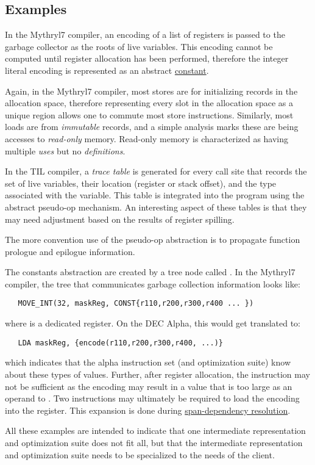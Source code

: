 \subsection{Examples}
   
   In the Mythryl7 compiler, an encoding of a list of registers
   is passed to the garbage collector as the roots of live
   variables. This encoding cannot be computed until register
   allocation has been performed, therefore the integer literal
   encoding is represented as an abstract 
   \href{constants.html}{constant}.

    Again, in the Mythryl7 compiler, most stores are for initializing 
   records in the allocation space, therefore representing every slot in
   the allocation space as a unique region allows one to commute
   most store instructions. Similarly, most loads are from
   \emph{immutable} records, and a simple analysis marks these are
   being accesses to \emph{read-only} memory. Read-only memory is
   characterized as having multiple \emph{uses} but no
   \emph{definitions}.

    In the TIL compiler, a \emph{trace table} is generated for
   every call site that records the set of live variables, their
   location (register or stack offset), and the type associated with
   the variable. This table is integrated into the program using the
   abstract pseudo-op mechanism. An interesting aspect of these tables
   is that they may need adjustment based on the results of register
   spilling.

    The more convention use of the pseudo-op abstraction is to
   propagate function prologue and epilogue information.

    The constants abstraction are created by a tree node called
   . In the Mythryl7 compiler, the tree that communicates
   garbage collection information looks like:

\begin{verbatim}
   MOVE_INT(32, maskReg, CONST{r110,r200,r300,r400 ... })
\end{verbatim}

  where  is a dedicated register. On the DEC Alpha,
  this would get translated to:

\begin{verbatim}
   LDA maskReg, {encode(r110,r200,r300,r400, ...)}
\end{verbatim}

   which indicates that the alpha instruction set (and optimization
   suite) know about these types of values. Further, after
   register allocation, the  instruction may not be
   sufficient as the encoding may result in a value that is too large
   as an operand to . Two instructions may ultimately be
   required to load the encoding into the 
   register. This expansion is done during 
   \href{span-dep.html}{span-dependency resolution}.

    All these examples are intended to indicate that one
   intermediate representation and optimization suite does not fit
   all, but that the intermediate representation and optimization
   suite needs to be specialized to the needs of the client.
